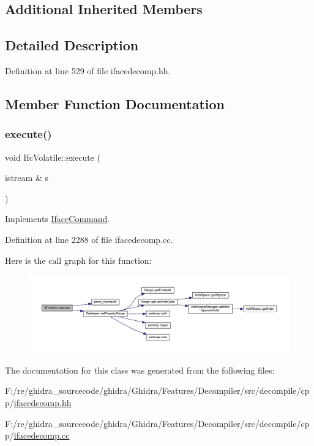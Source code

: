 \subsection*{Additional Inherited Members}


\subsection{Detailed Description}


Definition at line 529 of file ifacedecomp.\+hh.



\subsection{Member Function Documentation}
\mbox{\label{class_ifc_volatile_a41bd6c55a0838a7c46925e1a2409fb9f}} 
\subsubsection{\texorpdfstring{execute()}{execute()}}
{\footnotesize\ttfamily void Ifc\+Volatile\+::execute (\begin{DoxyParamCaption}\item[{istream \&}]{s }\end{DoxyParamCaption})\hspace{0.3cm}{\ttfamily [virtual]}}



Implements \mbox{\hyperlink{class_iface_command_af10e29cee2c8e419de6efe9e680ad201}{Iface\+Command}}.



Definition at line 2288 of file ifacedecomp.\+cc.

Here is the call graph for this function\+:
\nopagebreak
\begin{figure}[H]
\begin{center}
\leavevmode
\includegraphics[width=350pt]{class_ifc_volatile_a41bd6c55a0838a7c46925e1a2409fb9f_cgraph}
\end{center}
\end{figure}


The documentation for this class was generated from the following files\+:\begin{DoxyCompactItemize}
\item 
F\+:/re/ghidra\+\_\+sourcecode/ghidra/\+Ghidra/\+Features/\+Decompiler/src/decompile/cpp/\mbox{\hyperlink{ifacedecomp_8hh}{ifacedecomp.\+hh}}\item 
F\+:/re/ghidra\+\_\+sourcecode/ghidra/\+Ghidra/\+Features/\+Decompiler/src/decompile/cpp/\mbox{\hyperlink{ifacedecomp_8cc}{ifacedecomp.\+cc}}\end{DoxyCompactItemize}
